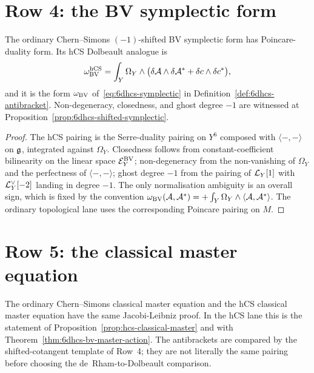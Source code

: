 \section{Row 4: the BV symplectic form}
\label{sec:cfg-row-4-symplectic}

\begin{theorem}
\label{thm:cfg-row-4}
The ordinary Chern--Simons $(-1)$-shifted BV symplectic form has
Poincare-duality form. Its hCS Dolbeault analogue is
\[
 \omega^{\mathrm{hCS}}_{\mathrm{BV}}
 = \int_Y\Omega_Y\wedge\bigl(\delta\mathcal{A}\wedge\delta\mathcal{A}^*
 +\delta c\wedge \delta c^*\bigr),
\]
and it is the form $\omega_{\mathrm{BV}}$
of~\eqref{eq:6dhcs-symplectic} in
Definition~\ref{def:6dhcs-antibracket}. Non-degeneracy, closedness,
and ghost degree $-1$ are witnessed at
Proposition~\ref{prop:6dhcs-shifted-symplectic}.
\end{theorem}

\begin{proof}
The hCS pairing is the Serre-duality pairing on $Y^6$ composed with
$\langle-,-\rangle$ on $\mathfrak{g}$, integrated against $\Omega_Y$. Closedness
follows from constant-coefficient bilinearity on the linear space
$\mathcal{E}^{\mathrm{BV}}_Y$; non-degeneracy from the non-vanishing of $\Omega_Y$ and
the perfectness of $\langle-,-\rangle$; ghost degree $-1$ from the
pairing of $\mathcal{L}_Y[1]$ with $\mathcal{L}_Y^\vee[-2]$ landing in degree
$-1$. The only normalisation ambiguity is an overall sign, which is
fixed by the convention
$\omega_{\mathrm{BV}}(\mathcal{A},\mathcal{A}^*) = +\int_Y\Omega_Y\wedge\langle\mathcal{A},\mathcal{A}^*\rangle$.
The ordinary topological lane uses the corresponding Poincare pairing
on $M$.
\end{proof}

\section{Row 5: the classical master equation}
\label{sec:cfg-row-5-classical-master}

\begin{theorem}
\label{thm:cfg-row-5}
The ordinary Chern--Simons classical master equation and the hCS
classical master equation have the same Jacobi-Leibniz proof. In the
hCS lane this is the statement of
Proposition~\ref{prop:hcs-classical-master} and with
Theorem~\ref{thm:6dhcs-bv-master-action}. The antibrackets are compared
by the shifted-cotangent template of Row~4; they are not literally the
same pairing before choosing the de~Rham-to-Dolbeault comparison.
\end{theorem}

